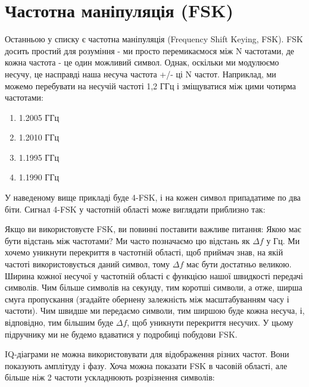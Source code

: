 \section{Частотна маніпуляція
(FSK)}\label{ux447ux430ux441ux442ux43eux442ux43dux430-ux43cux430ux43dux456ux43fux443ux43bux44fux446ux456ux44f-fsk}

Останньою у списку є частотна маніпуляція (Frequency Shift Keying, FSK).
FSK досить простий для розуміння - ми просто перемикаємося між N
частотами, де кожна частота - це один можливий символ. Однак, оскільки
ми модулюємо несучу, це насправді наша несуча частота +/- ці N частот.
Наприклад, ми можемо перебувати на несучій частоті 1,2 ГГц і зміщуватися
між цими чотирма частотами:

\begin{enumerate}
\def\labelenumi{\arabic{enumi}.}
\tightlist
\item
  1.2005 ГГц
\item
  1.2010 ГГц
\item
  1.1995 ГГц
\item
  1.1990 ГГц
\end{enumerate}

У наведеному вище прикладі буде 4-FSK, і на кожен символ припадатиме по
два біти. Сигнал 4-FSK у частотній області може виглядати приблизно так:

\href{../_images/fsk.svg}{}

Якщо ви використовуєте FSK, ви повинні поставити важливе питання: Якою
має бути відстань між частотами? Ми часто позначаємо цю відстань як
\(\Delta f\) у Гц. Ми хочемо уникнути перекриття в частотній області,
щоб приймач знав, на якій частоті використовується даний символ, тому
\(\Delta f\) має бути достатньо великою. Ширина кожної несучої у
частотній області є функцією нашої швидкості передачі символів. Чим
більше символів на секунду, тим коротші символи, а отже, ширша смуга
пропускання (згадайте обернену залежність між масштабуванням часу і
частоти). Чим швидше ми передаємо символи, тим ширшою буде кожна несуча,
і, відповідно, тим більшим буде \(\Delta f\), щоб уникнути перекриття
несучих. У цьому підручнику ми не будемо вдаватися у подробиці побудови
FSK.

IQ-діаграми не можна використовувати для відображення різних частот.
Вони показують амплітуду і фазу. Хоча можна показати FSK в часовій
області, але більше ніж 2 частоти ускладнюють розрізнення символів:

\href{../_images/fsk2.svg}{}

